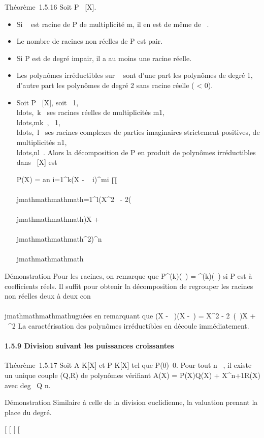 Théorème~1.5.16 Soit P \in {}~{[}X{]}.

\begin{itemize}
\item
  Si \alpha~ \in {} est racine de P de multiplicité m, il en est de même de
  \overline\alpha~.
\item
  Le nombre de racines non réelles de P est pair.
\item
  Si P est de degré impair, il a au moins une racine réelle.
\item
  Les polynômes irréductibles sur ~ sont d'une part les polynômes de
  degré 1, d'autre part les polynômes de degré 2 sans racine réelle (\Delta
  \textless{} 0).
\item
  Soit P \in {}~{[}X{]}, soit
  \alpha~1,\\ldots,\alpha~k~
  ses racines réelles de multiplicités
  m1,\\ldots,mk~,
  \beta~1,\\ldots,\beta~l~
  ses racines complexes de parties imaginaires strictement positives, de
  multiplicités
  n1,\\ldots,nl~.
  Alors la décomposition de P en produit de polynômes irréductibles dans
  ~{[}X{]} est

  P(X) = an \∏
  i=1^k(X - \alpha~ i)^mi 
  ∏ \\\\jmathmathmathmath=1^l(X^2~ -
  2\mathrmRe(\beta~ \\\\jmathmathmathmath)X +
  \textbar{}\beta~\\\\jmathmathmathmath\textbar{}^2)^n\\\\jmathmathmathmath 
\end{itemize}

Démonstration Pour les racines, on remarque que
P^(k)(\overline\alpha~) =
\overlineP^(k)(\alpha~) si P est à coefficients
réels. Il suffit pour obtenir la décomposition de regrouper les racines
non réelles deux à deux con\\\\jmathmathmathmathuguées en remarquant que (X - \beta~)(X
-\overline\beta~) = X^2 -
2\mathrmRe~(\beta~)X +
\textbar{}\beta~\textbar{}^2 La caractérisation des polynômes
irréductibles en découle immédiatement.

\paragraph{1.5.9 Division suivant les puissances croissantes}

Théorème~1.5.17 Soit A \in K{[}X{]} et P \in K{[}X{]} tel que
P(0)\neq~0. Pour tout n \in {}~, il existe un unique
couple (Q,R) de polynômes vérifiant A(X) = P(X)Q(X) +
X^n+1R(X) avec deg~ Q \leq n.

Démonstration Similaire à celle de la division euclidienne, la valuation
prenant la place du degré.

{[}
{[}
{[}
{[}
